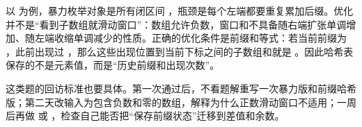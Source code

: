 以  为例，暴力枚举对象是所有闭区间 ，瓶颈是每个左端都要重复累加后缀。优化并不是“看到子数组就滑动窗口”：数组允许负数，窗口和不具备随右端扩张单调增加、随左端收缩单调减少的性质。正确的优化条件是前缀和等式：若当前前缀为 ，此前出现过 ，那么这些出现位置到当前下标之间的子数组和就是 。因此哈希表保存的不是元素值，而是“历史前缀和出现次数”。

这类题的回访标准也要具体。第一次通过后，不看题解重写一次暴力版和前缀哈希版；第二天改输入为包含负数和零的数组，解释为什么正数滑动窗口不适用；一周后再做  或 ，检查自己能否把“保存前缀状态”迁移到差值和余数。





